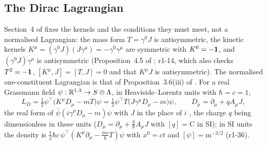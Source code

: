 \subsection{The Dirac Lagrangian}
\label{r1:sec:dirac}

Section~4 of \cite{ES17} fixes the kernels and the conditions they must meet, not a normalised Lagrangian: the mass form $T=\gamma^0J$
is antisymmetric, the kinetic kernels $K^\mu=(\gamma^0J)(J\gamma^\mu)=-\gamma^0\gamma^\mu$ are symmetric with $K^0=-\mathbf 1$, and
$(\gamma^0J)\gamma^\mu$ is antisymmetric (Proposition~4.5 of \cite{ES17}; r1-14, which also checks $T^2=-\mathbf 1$, $[K^\mu,J]=[T,J]=0$ and that
$K^\mu J$ is antisymmetric). The normalised one-constituent Lagrangian is that of Proposition~3.6(iii) of \cite{RE}. For a real Grassmann
field $\psi:\mathbb{R}^{1,3}\to S\otimes\Lambda$, in Heaviside--Lorentz units with $\hbar=c=1$,
\begin{equation}
\label{r1:eq:LD}
L_D=\tfrac12\psi^{\!\top}\bigl(K^\mu D_\mu-mT\bigr)\psi=\tfrac12\psi^{\!\top}T\bigl(J\gamma^\mu D_\mu-m\bigr)\psi,\qquad
D_\mu=\partial_\mu+qA_\mu J ,
\end{equation}
the real form of $\bar\psi(i\gamma^\mu D_\mu-m)\psi$ with $J$ in the place of $i$ \cite{Hestenes67}, the charge $q$ being dimensionless in
these units ($D_\mu=\partial_\mu+\tfrac q\hbar A_\mu J$ with $[q]=\mathrm C$ in SI); in SI units the density is
$\tfrac12\hbar c\,\psi^{\!\top}(K^\mu\partial_\mu-\tfrac{mc}\hbar T)\psi$ with $x^0=ct$ and $[\psi]=\mathrm m^{-3/2}$ (r1-36).

